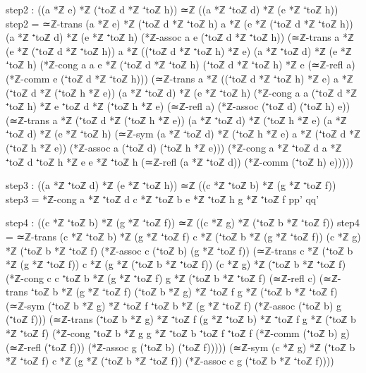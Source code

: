 \documentclass[11pt,a4paper]{book}
\begin{document}
\begin{code}
    step2 : ((a *ℤ e) *ℤ (⁺toℤ d *ℤ ⁺toℤ h)) ≃ℤ ((a *ℤ ⁺toℤ d) *ℤ (e *ℤ ⁺toℤ h))
    step2 = ≃ℤ-trans {(a *ℤ e) *ℤ (⁺toℤ d *ℤ ⁺toℤ h)} 
                     {a *ℤ (e *ℤ (⁺toℤ d *ℤ ⁺toℤ h))} 
                     {(a *ℤ ⁺toℤ d) *ℤ (e *ℤ ⁺toℤ h)}
            (*ℤ-assoc a e (⁺toℤ d *ℤ ⁺toℤ h))
            (≃ℤ-trans {a *ℤ (e *ℤ (⁺toℤ d *ℤ ⁺toℤ h))} 
                      {a *ℤ ((⁺toℤ d *ℤ ⁺toℤ h) *ℤ e)} 
                      {(a *ℤ ⁺toℤ d) *ℤ (e *ℤ ⁺toℤ h)}
             (*ℤ-cong {a} {a} {e *ℤ (⁺toℤ d *ℤ ⁺toℤ h)} {(⁺toℤ d *ℤ ⁺toℤ h) *ℤ e} 
                      (≃ℤ-refl a) (*ℤ-comm e (⁺toℤ d *ℤ ⁺toℤ h)))
             (≃ℤ-trans {a *ℤ ((⁺toℤ d *ℤ ⁺toℤ h) *ℤ e)} 
                       {a *ℤ (⁺toℤ d *ℤ (⁺toℤ h *ℤ e))} 
                       {(a *ℤ ⁺toℤ d) *ℤ (e *ℤ ⁺toℤ h)}
              (*ℤ-cong {a} {a} {(⁺toℤ d *ℤ ⁺toℤ h) *ℤ e} {⁺toℤ d *ℤ (⁺toℤ h *ℤ e)} 
                       (≃ℤ-refl a) (*ℤ-assoc (⁺toℤ d) (⁺toℤ h) e))
              (≃ℤ-trans {a *ℤ (⁺toℤ d *ℤ (⁺toℤ h *ℤ e))} 
                        {(a *ℤ ⁺toℤ d) *ℤ (⁺toℤ h *ℤ e)} 
                        {(a *ℤ ⁺toℤ d) *ℤ (e *ℤ ⁺toℤ h)}
               (≃ℤ-sym {(a *ℤ ⁺toℤ d) *ℤ (⁺toℤ h *ℤ e)} {a *ℤ (⁺toℤ d *ℤ (⁺toℤ h *ℤ e))} 
                       (*ℤ-assoc a (⁺toℤ d) (⁺toℤ h *ℤ e)))
               (*ℤ-cong {a *ℤ ⁺toℤ d} {a *ℤ ⁺toℤ d} {⁺toℤ h *ℤ e} {e *ℤ ⁺toℤ h} 
                        (≃ℤ-refl (a *ℤ ⁺toℤ d)) (*ℤ-comm (⁺toℤ h) e)))))

    step3 : ((a *ℤ ⁺toℤ d) *ℤ (e *ℤ ⁺toℤ h)) ≃ℤ ((c *ℤ ⁺toℤ b) *ℤ (g *ℤ ⁺toℤ f))
    step3 = *ℤ-cong {a *ℤ ⁺toℤ d} {c *ℤ ⁺toℤ b} {e *ℤ ⁺toℤ h} {g *ℤ ⁺toℤ f} pp' qq'
    
    step4 : ((c *ℤ ⁺toℤ b) *ℤ (g *ℤ ⁺toℤ f)) ≃ℤ ((c *ℤ g) *ℤ (⁺toℤ b *ℤ ⁺toℤ f))
    step4 = ≃ℤ-trans {(c *ℤ ⁺toℤ b) *ℤ (g *ℤ ⁺toℤ f)} 
                     {c *ℤ (⁺toℤ b *ℤ (g *ℤ ⁺toℤ f))} 
                     {(c *ℤ g) *ℤ (⁺toℤ b *ℤ ⁺toℤ f)}
            (*ℤ-assoc c (⁺toℤ b) (g *ℤ ⁺toℤ f))
            (≃ℤ-trans {c *ℤ (⁺toℤ b *ℤ (g *ℤ ⁺toℤ f))} 
                      {c *ℤ (g *ℤ (⁺toℤ b *ℤ ⁺toℤ f))} 
                      {(c *ℤ g) *ℤ (⁺toℤ b *ℤ ⁺toℤ f)}
             (*ℤ-cong {c} {c} {⁺toℤ b *ℤ (g *ℤ ⁺toℤ f)} {g *ℤ (⁺toℤ b *ℤ ⁺toℤ f)} 
                      (≃ℤ-refl c) 
                      (≃ℤ-trans {⁺toℤ b *ℤ (g *ℤ ⁺toℤ f)} 
                                {(⁺toℤ b *ℤ g) *ℤ ⁺toℤ f} 
                                {g *ℤ (⁺toℤ b *ℤ ⁺toℤ f)}
                       (≃ℤ-sym {(⁺toℤ b *ℤ g) *ℤ ⁺toℤ f} {⁺toℤ b *ℤ (g *ℤ ⁺toℤ f)} 
                               (*ℤ-assoc (⁺toℤ b) g (⁺toℤ f)))
                       (≃ℤ-trans {(⁺toℤ b *ℤ g) *ℤ ⁺toℤ f} 
                                 {(g *ℤ ⁺toℤ b) *ℤ ⁺toℤ f} 
                                 {g *ℤ (⁺toℤ b *ℤ ⁺toℤ f)}
                        (*ℤ-cong {⁺toℤ b *ℤ g} {g *ℤ ⁺toℤ b} {⁺toℤ f} {⁺toℤ f} 
                                 (*ℤ-comm (⁺toℤ b) g) (≃ℤ-refl (⁺toℤ f)))
                        (*ℤ-assoc g (⁺toℤ b) (⁺toℤ f)))))
             (≃ℤ-sym {(c *ℤ g) *ℤ (⁺toℤ b *ℤ ⁺toℤ f)} {c *ℤ (g *ℤ (⁺toℤ b *ℤ ⁺toℤ f))} 
                     (*ℤ-assoc c g (⁺toℤ b *ℤ ⁺toℤ f))))
    

\end{code}
\end{document}
